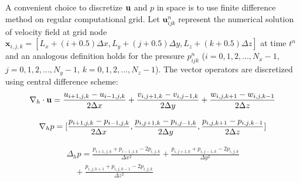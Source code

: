 A convenient choice to discretize $\mathbf{u}$ and $p$ in space is to use finite difference method on regular computational grid. Let $\mathbf{u}^n_{ijk}$ represent the
numerical solution of velocity field at grid node  $\mathbf{x}_{i,j,k} =
[L_x+(i+0.5)\Delta x,L_y+(j+0.5)\Delta y, L_z+(k+0.5)\Delta z]$ at time $t^n$ 
and an analogous definition holds for the pressure $p^n_{ijk}$ ($i =
0,1,2,...,N_x-1$, $j = 0,1,2,...,N_y-1$, $k = 0,1,2,...,N_z-1$). The vector operators are discretized using central difference scheme:
\begin{equation} 
\nabla_h\cdot \mathbf{u} =
\frac{u_{i+1,j,k}-u_{i-1,j,k}}{2\Delta x} +
\frac{v_{i,j+1,k}-v_{i,j-1,k}}{2\Delta y} +
\frac{w_{i,j,k+1}-w_{i,j,k-1}}{2\Delta z}
\label{divU} 
\end{equation}

\begin{equation}
\label{gradP} \nabla_h p =
[\frac{p_{i+1,j,k}-p_{i-1,j,k}}{2\Delta x},
\frac{p_{i,j+1,k}-p_{i,j-1,k}}{2\Delta y},
\frac{p_{i,j,k+1}-p_{i,j,k-1}}{2\Delta z}]\\    
\end{equation}

\begin{multline}
\label{lapP} 
\Delta_h p = \frac{p_{i+1,j,k}+p_{i-1,j,k}-2p_{i,j,k}}{\Delta x^2} +
\frac{p_{i,j+1,k}+p_{i,j-1,k}-2p_{i,j,k}}{\Delta y^2} \\
 \quad +\frac{p_{i,j,k+1}+p_{i,j,k-1}-2p_{i,j,k}}{\Delta z^2} 
\end{multline}

